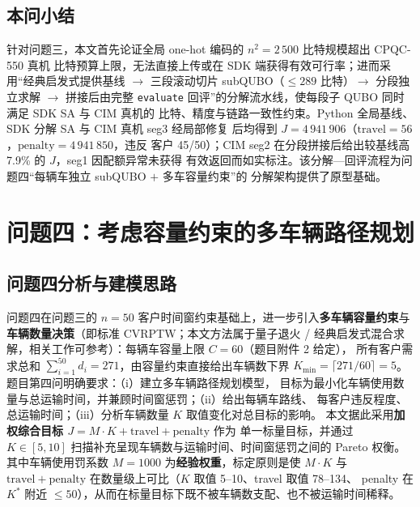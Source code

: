 \documentclass[UTF8,12pt,a4paper]{ctexart}
\begin{document}
\subsection{本问小结}

针对问题三，本文首先论证全局 one-hot 编码的 $n^{2}=2\,500$ 比特规模超出 CPQC-550 真机
比特预算上限，无法直接上传或在 SDK 端获得有效可行率；进而采用``经典启发式提供基线
$\to$ 三段滚动切片 subQUBO（$\le 289$ 比特）$\to$ 分段独立求解 $\to$ 拼接后由完整
\texttt{evaluate} 回评''的分解流水线，使每段子 QUBO 同时满足 SDK SA 与 CIM 真机的
比特、精度与链路一致性约束。Python 全局基线、SDK 分解 SA 与 CIM 真机 seg3 经局部修复
后均得到 $J=4\,941\,906$（$\mathrm{travel}=56$，$\mathrm{penalty}=4\,941\,850$，违反
客户 45/50）；CIM seg2 在分段拼接后给出较基线高 7.9\% 的 $J$，seg1 因配额异常未获得
有效返回而如实标注。该分解—回评流程为问题四``每辆车独立 subQUBO $+$ 多车容量约束''的
分解架构提供了原型基础。

\section{问题四：考虑容量约束的多车辆路径规划}
\label{sec:q4}

\subsection{问题四分析与建模思路}
\label{subsec:q4-analysis}

问题四在问题三的 $n=50$ 客户时间窗约束基础上，进一步引入\textbf{多车辆容量约束}与
\textbf{车辆数量决策}（即标准 CVRPTW\cite{toth2014vrp,solomon1987vrptw}；本文方法属于量子退火 / 经典启发式混合求解，相关工作可参考\cite{feld2019cvrp,salehi2022vrpqubo,harwood2021vrptwqubo}）：每辆车容量上限 $C=60$（题目附件 2 给定），
所有客户需求总和 $\sum_{i=1}^{50}d_i=271$，由容量约束直接给出车辆数下界
$K_{\min}=\lceil 271/60\rceil=5$。题目第四问明确要求：（i）建立多车辆路径规划模型，
目标为最小化车辆使用数量与总运输时间，并兼顾时间窗惩罚；（ii）给出每辆车路线、
每客户违反程度、总运输时间；（iii）分析车辆数量 $K$ 取值变化对总目标的影响。
本文据此采用\textbf{加权综合目标 $J=M\!\cdot\!K+\mathrm{travel}+\mathrm{penalty}$} 作为
单一标量目标，并通过 $K\in[5,10]$ 扫描补充呈现车辆数与运输时间、时间窗惩罚之间的 Pareto 权衡。
其中车辆使用罚系数 $M=1000$ 为\textbf{经验权重}，标定原则是使 $M\!\cdot\!K$ 与
$\mathrm{travel}+\mathrm{penalty}$ 在数量级上可比（$K$ 取值 5--10、travel 取值 78--134、
penalty 在 $K^*$ 附近 $\le 50$），从而在标量目标下既不被车辆数支配、也不被运输时间稀释。
\end{document}
